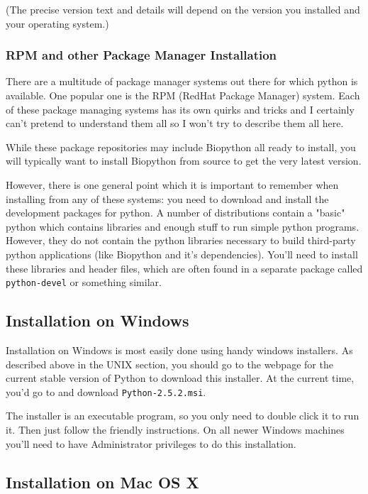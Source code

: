 \documentclass{article}
\begin{document}
\noindent (The precise version text and details will depend on the version you installed and your operating system.)

\subsubsection{RPM and other Package Manager Installation}

There are a multitude of package manager systems out there for which
python is available. One popular one is the RPM (RedHat Package Manager)
system. Each of these package managing systems has its own quirks and
tricks and I certainly can't pretend to understand them all so I won't
try to describe them all here.

While these package repositories may include Biopython all ready to install,
you will typically want to install Biopython from source to get the very
latest version.

However, there is one general point which it is important to remember
when installing from any of these systems: you need to download and
install the development packages for python. A number of distributions
contain a "basic" python which contains libraries and enough stuff to
run simple python programs. However, they do not contain the python
libraries necessary to build third-party python applications (like
Biopython and it's dependencies). You'll need to install these libraries
and header files, which are often found in a separate package called
\verb|python-devel| or something similar. 

\subsection{Installation on Windows} 

Installation on Windows is most easily done using handy windows
installers. As described above in the UNIX section, you should go to the
webpage for the current stable version of Python to download this
installer. At the current time, you'd go to
 and download
\verb|Python-2.5.2.msi|. 

The installer is an executable program, so you only need to double click
it to run it. Then just follow the friendly instructions. On all newer Windows
machines you'll need to have Administrator privileges to do this
installation.

\subsection{Installation on Mac OS X}
\end{document}
